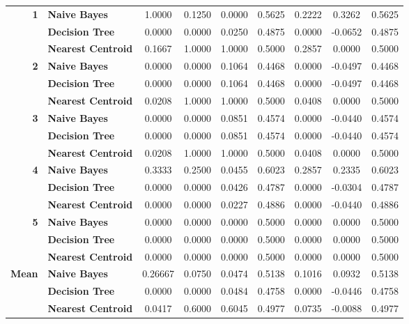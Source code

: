 \begin{center}
\begin{longtable}{ | r  l | c | c | c | c | c | c | c | }
\multirow{3}{*}{\textbf{1}} & \textbf{Naive Bayes} & 
1.0000 & 0.1250 & 0.0000 & 0.5625 & 0.2222 & 0.3262  & 0.5625 \\
& \textbf{Decision Tree} & 
0.0000 & 0.0000 & 0.0250 & 0.4875 & 0.0000 & -0.0652 & 0.4875 \\
& \textbf{Nearest Centroid} &
0.1667 & 1.0000 & 1.0000 & 0.5000 & 0.2857 & 0.0000  & 0.5000 \\
\hline
\multirow{3}{*}{\textbf{2}} & \textbf{Naive Bayes} & 
0.0000 & 0.0000 & 0.1064 & 0.4468 & 0.0000 & -0.0497 & 0.4468 \\
& \textbf{Decision Tree} & 
0.0000 & 0.0000 & 0.1064 & 0.4468 & 0.0000 & -0.0497 & 0.4468 \\
& \textbf{Nearest Centroid} &
0.0208 & 1.0000 & 1.0000 & 0.5000 & 0.0408 & 0.0000 & 0.5000 \\
\hline
\multirow{3}{*}{\textbf{3}} & \textbf{Naive Bayes} & 
0.0000 & 0.0000 & 0.0851 & 0.4574 & 0.0000 & -0.0440 & 0.4574 \\
& \textbf{Decision Tree} & 
0.0000 & 0.0000 & 0.0851 & 0.4574 & 0.0000 & -0.0440 & 0.4574 \\
& \textbf{Nearest Centroid} &
0.0208 & 1.0000 & 1.0000 & 0.5000 & 0.0408 &  0.0000 & 0.5000 \\
\hline
\multirow{3}{*}{\textbf{4}} & \textbf{Naive Bayes} & 
0.3333 & 0.2500 & 0.0455 & 0.6023 & 0.2857 &  0.2335 & 0.6023 \\
& \textbf{Decision Tree} & 
0.0000 & 0.0000 & 0.0426 & 0.4787 & 0.0000 & -0.0304 & 0.4787 \\
& \textbf{Nearest Centroid} &
0.0000 & 0.0000 & 0.0227 & 0.4886 & 0.0000 & -0.0440 & 0.4886 \\
\hline
\multirow{3}{*}{\textbf{5}} & \textbf{Naive Bayes} & 
0.0000 & 0.0000 & 0.0000 & 0.5000 & 0.0000 & 0.0000 & 0.5000 \\
& \textbf{Decision Tree} & 
0.0000 & 0.0000 & 0.0000 & 0.5000 & 0.0000 & 0.0000 & 0.5000 \\
& \textbf{Nearest Centroid} &
0.0000 & 0.0000 & 0.0000 & 0.5000 & 0.0000 & 0.0000 & 0.5000 \\
\hline
\multirow{3}{*}{\textbf{Mean}} & \textbf{Naive Bayes} & 
0.26667 & 0.0750 & 0.0474 & 0.5138 & 0.1016 & 0.0932 & 0.5138 \\
& \textbf{Decision Tree} & 
0.0000 & 0.0000 & 0.0484 & 0.4758 & 0.0000 & -0.0446 & 0.4758 \\
& \textbf{Nearest Centroid} &
0.0417 & 0.6000 & 0.6045 & 0.4977 & 0.0735 & -0.0088 & 0.4977 \\
\hline
\end{longtable}
\end{center}

